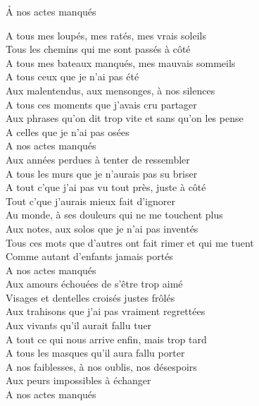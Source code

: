\documentclass{novel}
\begin{document}
\newpage
\normalsize

\h*{A nos actes manqués}

A tous mes loupés, mes ratés, mes vrais soleils \\
Tous les chemins qui me sont passés à côté \\
A tous mes bateaux manqués, mes mauvais sommeils \\
A tous ceux que je n'ai pas été \\

Aux malentendus, aux mensonges, à nos silences \\
A tous ces moments que j'avais cru partager \\
Aux phrases qu'on dit trop vite et sans qu'on les pense \\
A celles que je n'ai pas osées \\
A nos actes manqués \\

Aux années perdues à tenter de ressembler \\
A tous les murs que je n'aurais pas su briser \\
A tout c'que j'ai pas vu tout près, juste à côté \\
Tout c'que j'aurais mieux fait d'ignorer \\

Au monde, à ses douleurs qui ne me touchent plus \\
Aux notes, aux solos que je n'ai pas inventés \\
Tous ces mots que d'autres ont fait rimer et qui me tuent \\
Comme autant d'enfants jamais portés \\
A nos actes manqués \\

Aux amours échouées de s'être trop aimé \\
Visages et dentelles croisés justes frôlés \\
Aux trahisons que j'ai pas vraiment regrettées \\
Aux vivants qu'il aurait fallu tuer \\

A tout ce qui nous arrive enfin, mais trop tard \\
A tous les masques qu'il aura fallu porter \\
A nos faiblesses, à nos oublis, nos désespoirs \\
Aux peurs impossibles à échanger \\

A nos actes manqués
\end{document}
